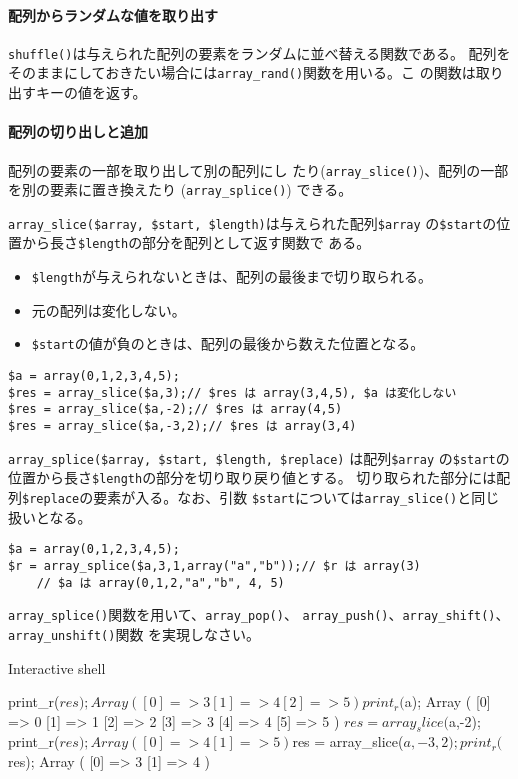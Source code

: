 \paragraph{配列からランダムな値を取り出す}
\Verb+shuffle()+は与えられた配列の要素をランダムに並べ替える関数である。
配列をそのままにしておきたい場合には\Verb+array_rand()+関数を用いる。こ
の関数は取り出すキーの値を返す。

\paragraph{配列の切り出しと追加}配列の要素の一部を取り出して別の配列にし
たり(\Verb+array_slice()+)、配列の一部を別の要素に置き換えたり
(\Verb+array_splice()+) できる。

\Verb+array_slice($array, $start, $length)+は与えられた配列\Verb+$array+
の\Verb+$start+の位置から長さ\Verb+$length+の部分を配列として返す関数で
ある。
\begin{itemize}
 \item \Verb+$length+が与えられないときは、配列の最後まで切り取られる。 
 \item 元の配列は変化しない。
 \item \Verb+$start+の値が負のときは、配列の最後から数えた位置となる。
\end{itemize}
\begin{Verbatim}
$a = array(0,1,2,3,4,5);
$res = array_slice($a,3);// $res は array(3,4,5), $a は変化しない
$res = array_slice($a,-2);// $res は array(4,5)
$res = array_slice($a,-3,2);// $res は array(3,4)
\end{Verbatim}
\Verb+array_splice($array, $start, $length, $replace)+ は配列\Verb+$array+
の\Verb+$start+の位置から長さ\Verb+$length+の部分を切り取り戻り値とする。
切り取られた部分には配列\Verb+$replace+の要素が入る。なお、引数
\Verb+$start+については\Verb+array_slice()+と同じ扱いとなる。
\begin{Verbatim}
$a = array(0,1,2,3,4,5);
$r = array_splice($a,3,1,array("a","b"));// $r は array(3)
	// $a は array(0,1,2,"a","b", 4, 5)
\end{Verbatim}
\begin{Prob}\upshape
\Verb+array_splice()+関数を用いて、\Verb+array_pop()+、
 \Verb+array_push()+、\Verb+array_shift()+、\\\Verb+array_unshift()+関数
 を実現しなさい。 
\end{Prob}
\iffalse
Interactive shell

print_r($res);
Array
(
    [0] => 3
    [1] => 4
    [2] => 5
)
print_r($a);
Array
(
    [0] => 0
    [1] => 1
    [2] => 2
    [3] => 3
    [4] => 4
    [5] => 5
)
$res = array_slice($a,-2);
print_r($res);
Array
(
    [0] => 4
    [1] => 5
)
$res = array_slice($a,-3,2);
print_r($res);
Array
(
    [0] => 3
    [1] => 4
)

